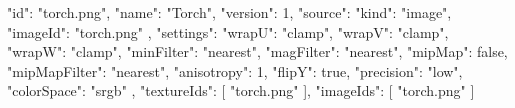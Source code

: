 {
  "id": "torch.png",
  "name": "Torch",
  "version": 1,
  "source": {
    "kind": "image",
    "imageId": "torch.png"
  },
  "settings": {
    "wrapU": "clamp",
    "wrapV": "clamp",
    "wrapW": "clamp",
    "minFilter": "nearest",
    "magFilter": "nearest",
    "mipMap": false,
    "mipMapFilter": "nearest",
    "anisotropy": 1,
    "flipY": true,
    "precision": "low",
    "colorSpace": "srgb"
  },
  "textureIds": [
    "torch.png"
  ],
  "imageIds": [
    "torch.png"
  ]
}
